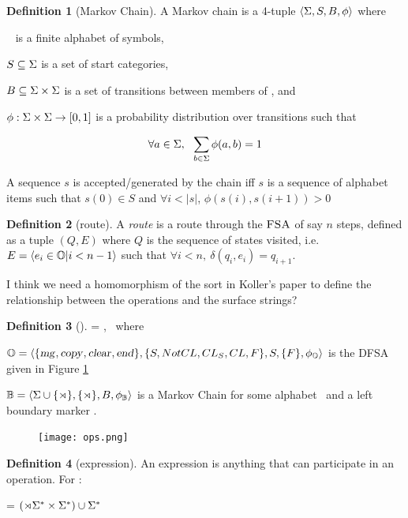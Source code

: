 \documentclass[12pt]{article}
\theoremstyle{definition}
\newtheorem{definition}{Definition}[section]
\begin{document}
\begin{definition}[Markov Chain]
  A Markov chain is a 4-tuple $\langle \Sigma, S, B, \phi  \rangle $ where 

\sg~ is a finite alphabet of symbols, 

$S\subseteq \Sigma$ is a set of start categories,
 
$B\subseteq \Sigma\times\Sigma$ is a set of transitions between members of \sg, and

$\phi: \Sigma \times \Sigma \rightarrow [0,1]$ is a probability distribution over transitions such that

$$\forall a\in \Sigma,~~\sum_{b\in\Sigma} \phi(a,b) = 1 $$


A sequence $s$ is accepted/generated by the chain iff $s$ is a sequence of alphabet items such that $s(0) \in S$ and $\forall i<|s|$, $\phi(s(i),s(i+1))>0$ 

\end{definition}

\begin{definition}[route]
  A \emph{route} is a route through the $\textsc{FSA}$ of say $n$ steps, defined as a tuple $(Q,E)$ where $Q$ is the sequence of states visited, i.e.
 $E=\langle e_i\in\mathbb{O}|i<n-1\rangle$ such that $\forall i<n,~ \delta(q_i,e_i)=q_{i+1}$.

\end{definition}

  I think we need a homomorphism of the sort in Koller's paper to define the relationship between the operations and the surface strings?


\begin{definition}[\OURG]
  \OURG = \la \OPS,\BIGR\ra~ where

  $\mathbb{O} = \langle \{\text{\textsl{mg}},\text{\textsl{copy}},\text{\textsl{clear}},\text{\textsl{end}}\}, \{S,NotCL,CL_S,CL,F\}, S, \{F\}, \phi_{\mathbb{O}}\rangle$ is the DFSA given in Figure \ref{fig:ops}

  $\mathbb{B} = \langle \Sigma\cup\{{\rtimes}\}, \{\rtimes\}, B, \phi_{\mathbb{B}} \rangle$ is a Markov Chain  for some alphabet \sg~and a left boundary marker \LBOUND.
  
\end{definition}


\begin{figure}[H]
  \centering
  \texttt{[image: ops.png]}
  \caption{\OPS}
  \label{fig:ops}
\end{figure}

  
\begin{definition}[expression]
  An expression is anything that can participate in an operation. For \OURG:

  \expr = $(\rtimes\Sigma^*\times\Sigma^*) \cup \Sigma^*$
  
\end{definition}
\end{document}
